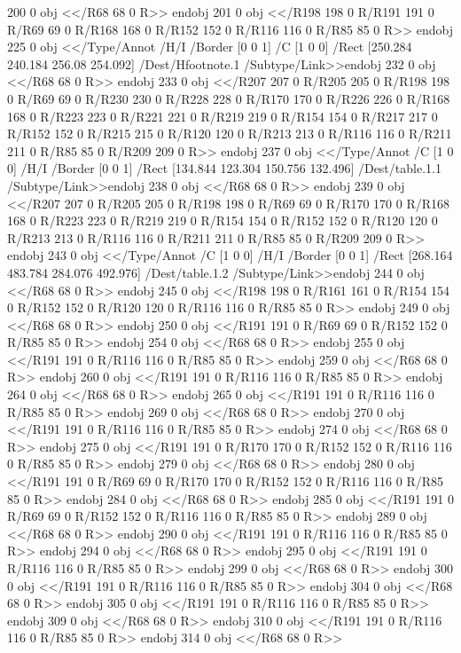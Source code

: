 {{{{{{{{{{{{{{{{{{{{{{{{{{{{200 0 obj
<</R68
68 0 R>>
endobj
201 0 obj
<</R198
198 0 R/R191
191 0 R/R69
69 0 R/R168
168 0 R/R152
152 0 R/R116
116 0 R/R85
85 0 R>>
endobj
225 0 obj
<</Type/Annot
/H/I
/Border [0 0 1]
/C [1 0 0]
/Rect [250.284 240.184 256.08 254.092]
/Dest/Hfootnote.1
/Subtype/Link>>endobj
232 0 obj
<</R68
68 0 R>>
endobj
233 0 obj
<</R207
207 0 R/R205
205 0 R/R198
198 0 R/R69
69 0 R/R230
230 0 R/R228
228 0 R/R170
170 0 R/R226
226 0 R/R168
168 0 R/R223
223 0 R/R221
221 0 R/R219
219 0 R/R154
154 0 R/R217
217 0 R/R152
152 0 R/R215
215 0 R/R120
120 0 R/R213
213 0 R/R116
116 0 R/R211
211 0 R/R85
85 0 R/R209
209 0 R>>
endobj
237 0 obj
<</Type/Annot
/C [1 0 0]
/H/I
/Border [0 0 1]
/Rect [134.844 123.304 150.756 132.496]
/Dest/table.1.1
/Subtype/Link>>endobj
238 0 obj
<</R68
68 0 R>>
endobj
239 0 obj
<</R207
207 0 R/R205
205 0 R/R198
198 0 R/R69
69 0 R/R170
170 0 R/R168
168 0 R/R223
223 0 R/R219
219 0 R/R154
154 0 R/R152
152 0 R/R120
120 0 R/R213
213 0 R/R116
116 0 R/R211
211 0 R/R85
85 0 R/R209
209 0 R>>
endobj
243 0 obj
<</Type/Annot
/C [1 0 0]
/H/I
/Border [0 0 1]
/Rect [268.164 483.784 284.076 492.976]
/Dest/table.1.2
/Subtype/Link>>endobj
244 0 obj
<</R68
68 0 R>>
endobj
245 0 obj
<</R198
198 0 R/R161
161 0 R/R154
154 0 R/R152
152 0 R/R120
120 0 R/R116
116 0 R/R85
85 0 R>>
endobj
249 0 obj
<</R68
68 0 R>>
endobj
250 0 obj
<</R191
191 0 R/R69
69 0 R/R152
152 0 R/R85
85 0 R>>
endobj
254 0 obj
<</R68
68 0 R>>
endobj
255 0 obj
<</R191
191 0 R/R116
116 0 R/R85
85 0 R>>
endobj
259 0 obj
<</R68
68 0 R>>
endobj
260 0 obj
<</R191
191 0 R/R116
116 0 R/R85
85 0 R>>
endobj
264 0 obj
<</R68
68 0 R>>
endobj
265 0 obj
<</R191
191 0 R/R116
116 0 R/R85
85 0 R>>
endobj
269 0 obj
<</R68
68 0 R>>
endobj
270 0 obj
<</R191
191 0 R/R116
116 0 R/R85
85 0 R>>
endobj
274 0 obj
<</R68
68 0 R>>
endobj
275 0 obj
<</R191
191 0 R/R170
170 0 R/R152
152 0 R/R116
116 0 R/R85
85 0 R>>
endobj
279 0 obj
<</R68
68 0 R>>
endobj
280 0 obj
<</R191
191 0 R/R69
69 0 R/R170
170 0 R/R152
152 0 R/R116
116 0 R/R85
85 0 R>>
endobj
284 0 obj
<</R68
68 0 R>>
endobj
285 0 obj
<</R191
191 0 R/R69
69 0 R/R152
152 0 R/R116
116 0 R/R85
85 0 R>>
endobj
289 0 obj
<</R68
68 0 R>>
endobj
290 0 obj
<</R191
191 0 R/R116
116 0 R/R85
85 0 R>>
endobj
294 0 obj
<</R68
68 0 R>>
endobj
295 0 obj
<</R191
191 0 R/R116
116 0 R/R85
85 0 R>>
endobj
299 0 obj
<</R68
68 0 R>>
endobj
300 0 obj
<</R191
191 0 R/R116
116 0 R/R85
85 0 R>>
endobj
304 0 obj
<</R68
68 0 R>>
endobj
305 0 obj
<</R191
191 0 R/R116
116 0 R/R85
85 0 R>>
endobj
309 0 obj
<</R68
68 0 R>>
endobj
310 0 obj
<</R191
191 0 R/R116
116 0 R/R85
85 0 R>>
endobj
314 0 obj
<</R68
68 0 R>>
}}}}}}}}}}}}}}}}}}}}}}}}}}}}
